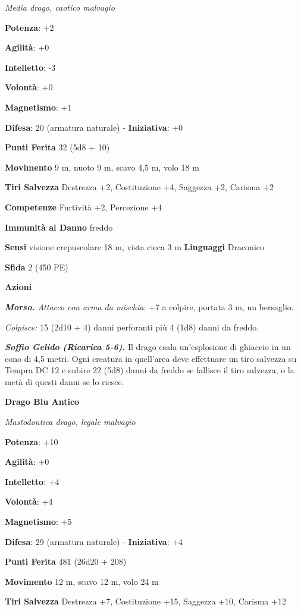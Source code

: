 \begin{multicols}{2}
\emph{Media drago, caotico malvagio}

\textbf{Potenza}: +2

\textbf{Agilità}: +0

\textbf{Intelletto}: -3

\textbf{Volontà}: +0

\textbf{Magnetismo}: +1

\textbf{Difesa}: 20 (armatura naturale) - \textbf{Iniziativa}: +0

\textbf{Punti Ferita} 32 (5d8 + 10)

\textbf{Movimento} 9 m, nuoto 9 m, scavo 4,5 m, volo 18 m

\textbf{Tiri Salvezza} Destrezza +2, Costituzione +4, Saggezza +2,
Carisma +2

\textbf{Competenze} Furtività +2, Percezione +4

\textbf{Immunità al Danno} freddo

\textbf{Sensi} visione crepuscolare 18 m, vista cieca 3 m
\textbf{Linguaggi} Draconico

\textbf{Sfida} 2 (450 PE)

\textbf{Azioni}

\emph{\textbf{Morso.} Attacco con arma da mischia}: +7 a colpire,
portata 3 m, un bersaglio.

\emph{Colpisce:} 15 (2d10 + 4) danni perforanti più 4 (1d8) danni da
freddo.

\emph{\textbf{Soffio Gelido (Ricarica 5-6).}} Il drago esala
un'esplosione di ghiaccio in un cono di 4,5 metri. Ogni creatura in
quell'area deve effettuare un tiro salvezza su Tempra DC 12 e
subire 22 (5d8) danni da freddo se fallisce il tiro salvezza, o la metà
di questi danni se lo riesce.



\textbf{Drago Blu Antico}

\emph{Mastodontica drago, legale malvagio}

\textbf{Potenza}: +10

\textbf{Agilità}: +0

\textbf{Intelletto}: +4

\textbf{Volontà}: +4

\textbf{Magnetismo}: +5

\textbf{Difesa}: 29 (armatura naturale) - \textbf{Iniziativa}: +4

\textbf{Punti Ferita} 481 (26d20 + 208)

\textbf{Movimento} 12 m, scavo 12 m, volo 24 m

\textbf{Tiri Salvezza} Destrezza +7, Costituzione +15, Saggezza +10,
Carisma +12


\end{multicols}

